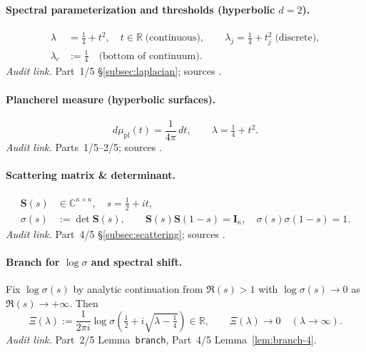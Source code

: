 \paragraph{Spectral parameterization and thresholds (hyperbolic $d=2$).}
\begin{align}
  \lambda &= \tfrac14 + t^2, \quad t\in\mathbb R \;\text{(continuous)}, \qquad
  \lambda_j = \tfrac14 + t_j^2 \;\text{(discrete)}, \\
  \lambda_c &:= \tfrac14 \quad \text{(bottom of continuum).} \label{eq:lambda-c}
\end{align}
\textit{Audit link.} Part~1/5 \S\ref{subsec:laplacian}; sources \cite{Hejhal1983II,Iwaniec2002,LaxPhillips1976}.

\paragraph{Plancherel measure (hyperbolic surfaces).}
\begin{equation}
  d\mu_{\mathrm{pl}}(t) = \frac{1}{4\pi}\,dt, \qquad \lambda=\tfrac14 + t^2.
  \label{eq:plancherel}
\end{equation}
\textit{Audit link.} Parts~1/5–2/5; sources \cite{Hejhal1983II}.

\paragraph{Scattering matrix \& determinant.}
\begin{align}
  \mathbf S(s) &\in \mathbb C^{\kappa\times\kappa}, \quad s=\tfrac12+it, \\
  \sigma(s) &:= \det \mathbf S(s), \qquad \mathbf S(s)\mathbf S(1-s) = \mathbf I_\kappa, \quad \sigma(s)\sigma(1-s)=1. \label{eq:sigma-def}
\end{align}
\textit{Audit link.} Part~4/5 \S\ref{subsec:scattering}; sources \cite{Hejhal1983II,LaxPhillips1976}.

\paragraph{Branch for $\log \sigma$ and spectral shift.}
Fix $\log \sigma(s)$ by analytic continuation from $\Re(s)>1$ with $\log \sigma(s)\to 0$ as $\Re(s)\to +\infty$. Then
\begin{equation}
  \Xi(\lambda) := \frac{1}{2\pi i}\log \sigma\!\left(\tfrac12 + i\sqrt{\lambda-\tfrac14}\right) \in \mathbb R, 
  \qquad \Xi(\lambda)\to 0 \quad (\lambda\to\infty).
  \label{eq:Xi-def}
\end{equation}
\textit{Audit link.} Part~2/5 Lemma~\texttt{branch}, Part~4/5 Lemma~\ref{lem:branch-4}.

